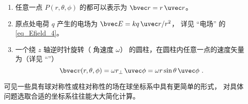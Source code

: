 \begin{example}{}
\begin{enumerate}
\item 任意一点 $P(r, \theta, \phi)$ 的都可以表示为 $\bvec r = r\,\uvec r$。
\item 原点处电荷 $q$ 产生的电场为 $\bvec E = k q \,\uvec r/r^2$， 详见 “电场” 的\autoref{eq_Efield_4}。
\item 一个绕 $z$ 轴逆时针旋转（ 角速度 $\omega $） 的圆柱，在圆柱内任意一点的速度矢量为（详见 “”）
\begin{equation}
\bvec v(r, \theta, \phi) = \omega r_\bot \,\uvec \phi = \omega r\sin \theta \,\uvec \phi ~.
\end{equation}
\end{enumerate}
可见一些具有球对称性或柱对称性的场在球坐标系中具有更简单的形式， 对具体问题选取合适的坐标系往往能大大简化计算。
\end{example}
